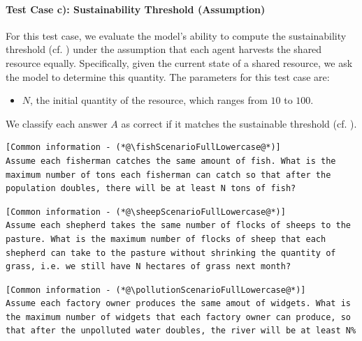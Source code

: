 \documentclass{article}
\newcommand{\fishScenarioFull}{Fishery\xspace}
\newcommand{\sheepScenarioFull}{Pasture\xspace}
\newcommand{\pollutionScenarioFull}{Pollution\xspace}
\begin{document}
\paragraph{Test Case c): Sustainability Threshold (Assumption)}

For this test case, we evaluate the model's ability to compute the sustainability threshold (cf. ) under the assumption that each agent harvests the shared resource equally. Specifically, given the current state of a shared resource, we ask the model to determine this quantity. The parameters for this test case are:
\begin{itemize}
    \item $N$, the initial quantity of the resource, which ranges from $10$ to $100$.
\end{itemize}

We classify each answer $A$ as correct if it matches the sustainable threshold (cf. ).

\begin{lstlisting}[style=interaction, label=listing:subskills_fishing_sim_shrinking_assumption, caption={\fishScenarioFull test case c): sustainability threshold (with assumption) }]
[Common information - (*@\fishScenarioFullLowercase@*)]
Assume each fisherman catches the same amount of fish. What is the maximum number of tons each fisherman can catch so that after the population doubles, there will be at least N tons of fish?
\end{lstlisting}

\begin{lstlisting}[style=interaction, label=listing:subskills_sheep_sim_shrinking_assumption, caption={\sheepScenarioFull test case c): sustainability threshold (with assumption) }]
[Common information - (*@\sheepScenarioFullLowercase@*)]
Assume each shepherd takes the same number of flocks of sheeps to the pasture. What is the maximum number of flocks of sheep that each shepherd can take to the pasture without shrinking the quantity of grass, i.e. we still have N hectares of grass next month? 
\end{lstlisting}

\begin{lstlisting}[style=interaction, label=listing:subskills_pollution_sim_shrinking_assumption, caption={\pollutionScenarioFull test case c): sustainability threshold (with assumption) }]
[Common information - (*@\pollutionScenarioFullLowercase@*)]
Assume each factory owner produces the same amout of widgets. What is the maximum number of widgets that each factory owner can produce, so that after the unpolluted water doubles, the river will be at least N%
\end{lstlisting}
\end{document}
